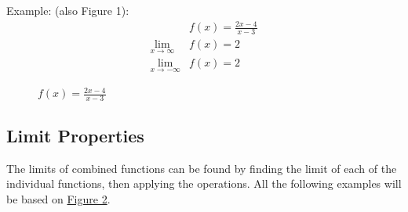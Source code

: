 \documentclass[12pt]{article}
\begin{document}
            \noindent Example: (also Figure 1):
            \begin{align*}
                &f(x) = \frac{2x-4}{x-3} \\
                \lim_{x \to \infty} &f(x) = 2 \\
                \lim_{x \to -\infty} &f(x) = 2
            \end{align*}

            \begin{figure}[H]
                \begin{center}
                    \caption{$f(x) = \frac{2x-4}{x-3}$}
                    \label{fig:limasymptote}
                \end{center}
            \end{figure}

        \subsection{Limit Properties}
            The limits of combined functions can be found by finding the limit of each of the individual functions, then applying the operations. All the following examples will be based on \hyperref[fig:limasymptote]{Figure 2}.
\end{document}
